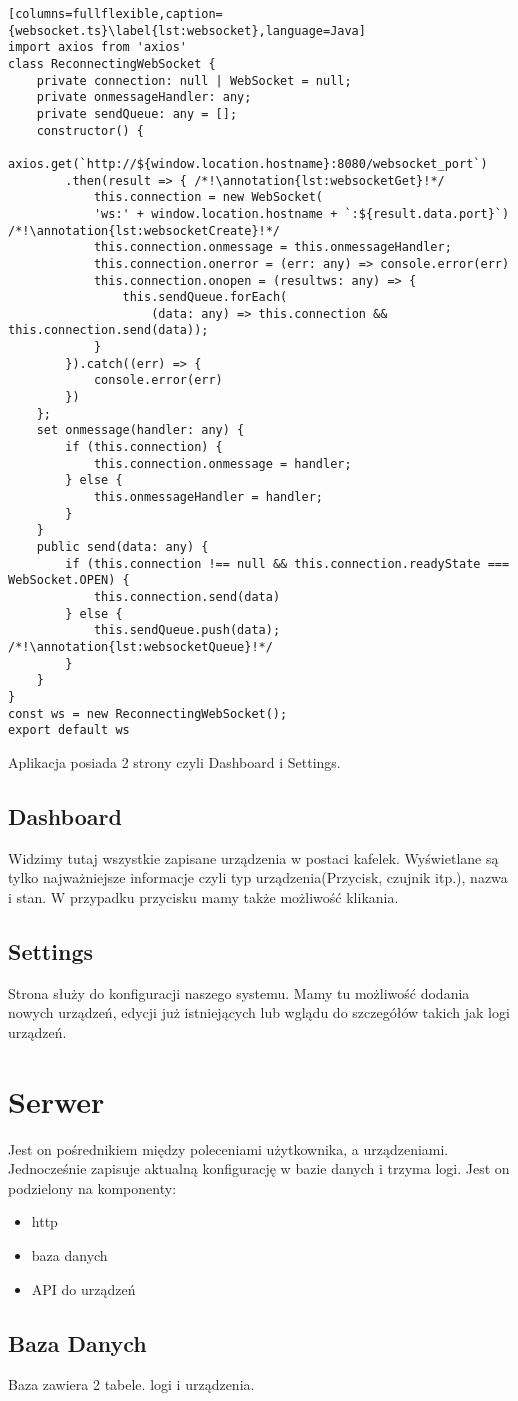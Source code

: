\begin{lstlisting}[columns=fullflexible,caption={websocket.ts}\label{lst:websocket},language=Java]
import axios from 'axios'
class ReconnectingWebSocket {
    private connection: null | WebSocket = null;
    private onmessageHandler: any;
    private sendQueue: any = [];
    constructor() {
        axios.get(`http://${window.location.hostname}:8080/websocket_port`)
        .then(result => { /*!\annotation{lst:websocketGet}!*/
            this.connection = new WebSocket(
            'ws:' + window.location.hostname + `:${result.data.port}`) /*!\annotation{lst:websocketCreate}!*/
            this.connection.onmessage = this.onmessageHandler;
            this.connection.onerror = (err: any) => console.error(err)
            this.connection.onopen = (resultws: any) => {
                this.sendQueue.forEach(
                    (data: any) => this.connection && this.connection.send(data));
            }
        }).catch((err) => {
            console.error(err)
        })
    };
    set onmessage(handler: any) {
        if (this.connection) {
            this.connection.onmessage = handler;
        } else {
            this.onmessageHandler = handler;
        }
    }
    public send(data: any) {
        if (this.connection !== null && this.connection.readyState === WebSocket.OPEN) {
            this.connection.send(data)
        } else {
            this.sendQueue.push(data); /*!\annotation{lst:websocketQueue}!*/
        }
    }
}
const ws = new ReconnectingWebSocket();
export default ws
\end{lstlisting}
\par Aplikacja posiada 2 strony czyli Dashboard i Settings.
\subsection{Dashboard}
Widzimy tutaj wszystkie zapisane urządzenia w postaci kafelek. Wyświetlane są tylko najważniejsze informacje czyli typ urządzenia(Przycisk, czujnik itp.), nazwa i stan. W przypadku przycisku mamy także możliwość klikania. 
\subsection{Settings}
Strona służy do konfiguracji naszego systemu. Mamy tu możliwość dodania nowych urządzeń, edycji już istniejących lub wglądu do szczegółów takich jak logi urządzeń.
\section{Serwer}
Jest on pośrednikiem między poleceniami użytkownika, a urządzeniami. Jednocześnie zapisuje aktualną konfigurację w bazie danych i trzyma logi. Jest on podzielony na komponenty:
\begin{itemize}
    \item http
    \item baza danych
    \item API do urządzeń
\end{itemize}
\subsection{Baza Danych}
Baza zawiera 2 tabele. logi i urządzenia. 